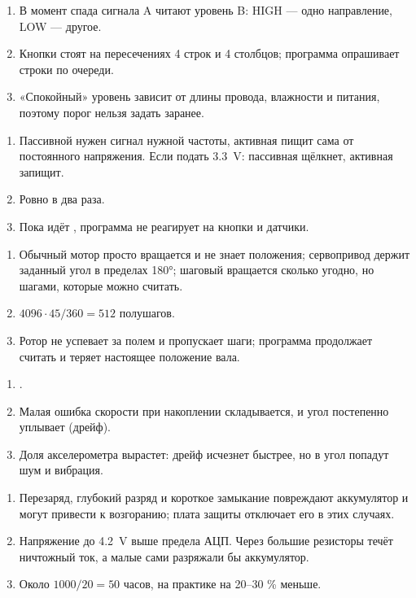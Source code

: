 \begin{enumerate}
  \item В момент спада сигнала A читают уровень B: HIGH --- одно направление, LOW --- другое.
  \item Кнопки стоят на пересечениях 4 строк и 4 столбцов; программа опрашивает строки по очереди.
  \item «Спокойный» уровень зависит от длины провода, влажности и питания, поэтому порог нельзя задать заранее.
\end{enumerate}

\begin{enumerate}
  \item Пассивной нужен сигнал нужной частоты, активная пищит сама от постоянного напряжения. Если подать \SI{3.3}{V}: пассивная щёлкнет, активная запищит.
  \item Ровно в два раза.
  \item Пока идёт , программа не реагирует на кнопки и датчики.
\end{enumerate}

\begin{enumerate}
  \item Обычный мотор просто вращается и не знает положения; сервопривод держит заданный угол в пределах 180°; шаговый вращается сколько угодно, но шагами, которые можно считать.
  \item $4096 \cdot 45 / 360 = 512$ полушагов.
  \item Ротор не успевает за полем и пропускает шаги; программа продолжает считать и теряет настоящее положение вала.
\end{enumerate}

\begin{enumerate}
  \item {}.
  \item Малая ошибка скорости при накоплении складывается, и угол постепенно уплывает (дрейф).
  \item Доля акселерометра вырастет: дрейф исчезнет быстрее, но в угол попадут шум и вибрация.
\end{enumerate}

\begin{enumerate}
  \item Перезаряд, глубокий разряд и короткое замыкание повреждают аккумулятор и могут привести к возгоранию; плата защиты отключает его в этих случаях.
  \item Напряжение до \SI{4.2}{V} выше предела АЦП. Через большие резисторы течёт ничтожный ток, а малые сами разряжали бы аккумулятор.
  \item Около $1000 / 20 = 50$ часов, на практике на 20--30 \% меньше.
\end{enumerate}

